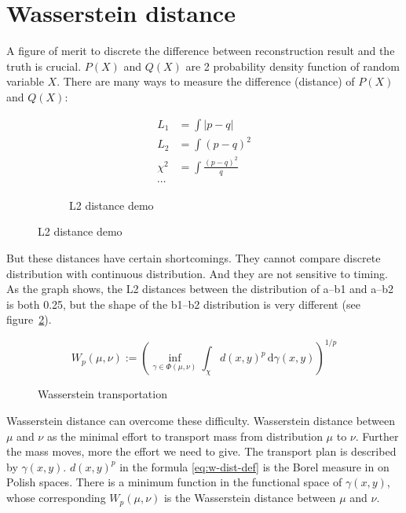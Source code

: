 \section{Wasserstein distance} %
A figure of merit to discrete the difference between reconstruction result and the truth is crucial. $P(X)$ and $Q(X)$ are 2 probability density function of random variable $X$. There are many ways to measure the difference (distance) of $P(X)$ and $Q(X)$: 

\begin{figure}[H]
\begin{minipage}{.25\textwidth}
\begin{align*}
    L_{1} &= \int|p-q| \\
    L_{2} &= \int(p-q)^{2} \\
    \chi^{2} &= \int\frac{(p-q)^{2}}{q} \\
    \cdots
\end{align*}
\end{minipage}
\begin{minipage}{.7\textwidth}
\begin{figure}[H]
    \centering
    \scalebox{0.4}{}
    \caption{\label{fig:l2} L2 distance demo}
\end{figure}
\end{minipage}
\end{figure}

But these distances have certain shortcomings. They cannot compare discrete distribution with continuous distribution. And they are not sensitive to timing. As the graph shows, the L2 distances between the distribution of a--b1 and a--b2 is both 0.25, but the shape of the b1--b2 distribution is very different (see figure~\ref{fig:l2}). 

\label{sub:Wasserstein distance}
    \begin{equation}
        W_{p}(\mu,\nu):=\left(\inf_{\gamma\in\Phi(\mu,\nu)}\int_{\chi}d(x,y)^{p}\,\mathrm{d}\gamma(x,y)\right)^{1/p}
        \label{eq:w-dist-def}
    \end{equation}
    \begin{figure}[H]
        \centering
        \scalebox{0.4}{}
        \caption{\label{fig:Wasserstein transportation} Wasserstein transportation}
    \end{figure}

Wasserstein distance can overcome these difficulty. Wasserstein distance between $\mu$ and $\nu$ as the minimal effort to transport mass from distribution $\mu$ to $\nu$. Further the mass moves, more the effort we need to give. The transport plan is described by $\gamma(x, y)$. $d(x,y)^{p}$ in the formula \eqref{eq:w-dist-def} is the Borel measure in
on Polish spaces. There is a minimum function in the functional space of $\gamma(x, y)$, whose corresponding $W_{p}(\mu ,\nu)$ is the Wasserstein distance between $\mu$ and $\nu$. 

